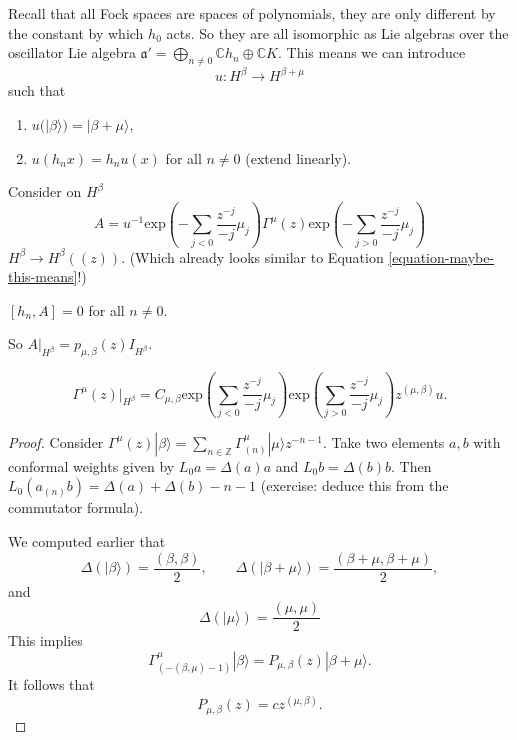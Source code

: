Recall that all Fock spaces are spaces of polynomials,
they are only different by the constant by which $h_0$ acts.
So they are all isomorphic as Lie algebras over the oscillator Lie algebra
$\mathfrak{a}'=\bigoplus_{n \neq 0}\mathbb{C}h_n \oplus \mathbb{C}K$.
This means we can introduce
$$
u:H^\beta \to H^{\beta+\mu}
$$
such that
\begin{enumerate}
\item $u(|\beta\rangle)=|\beta+\mu\rangle$,
\item $u(h_nx)=h_nu(x)$ for all  $n \neq 0$ (extend linearly).
\end{enumerate}

\noindent
Consider on $H^\beta$
\begin{equation}
\label{equation-quantum-field-vmod}
A=u^{-1}\text{exp}\left(-\sum_{j<0}\frac{z^{-j}}{-j}\mu_j\right)\Gamma^\mu(z)
\text{exp}\left(-\sum_{j>0}\frac{z^{-j}}{-j}\mu_j\right)
\end{equation}
$H^\beta \to H^\beta((z))$.
(Which already looks similar to Equation \ref{equation-maybe-this-means}!)

\begin{exercise}
\label{exercise-a-and-hn}
$[h_n,A]=0$ for all $n \neq 0$.
\end{exercise}

\noindent
So $A|_{H^{\beta}}=p_{\mu,\beta}(z)I_{H^\beta}$.

\begin{proposition}
\label{proposition-exponentials}
$$
\Gamma^\mu(z)|_{H^\beta}=C_{\mu,\beta}
\text{exp}\left(\sum_{j<0}\frac{z^{-j}}{-j}\mu_j\right)
\text{exp}\left(\sum_{j>0}\frac{z^{-j}}{-j}\mu_j\right)z^{(\mu,\beta)}u.
$$
\end{proposition}

\begin{proof}
Consider $\Gamma^\mu(z)|\beta\rangle=
\sum_{n \in \mathbb{Z}}\Gamma^\mu_{(n)}|\mu\rangle z^{-n-1}$.
Take two elements $a,b$ with conformal weights given by
 $L_0a=\Delta(a)a$ and $L_0b=\Delta(b)b$.
Then $L_0(a_{(n)}b)=\Delta(a)+\Delta(b)-n-1$
(exercise: deduce this from the commutator formula).

We computed earlier that
$$
\Delta(|\beta\rangle)=\frac{(\beta,\beta)}{2},\qquad 
\Delta(|\beta+\mu\rangle)=\frac{(\beta+\mu,\beta+\mu)}{2},
$$
and
$$
\Delta(|\mu\rangle)=\frac{(\mu,\mu)}{2}
$$
This implies
$$
\Gamma^\mu_{(-(\beta,\mu)-1)}|\beta\rangle
=P_{\mu,\beta}(z)|\beta+\mu\rangle.
$$
It follows that
$$
P_{\mu,\beta}(z)=c z^{(\mu,\beta)}.
$$
\end{proof}

